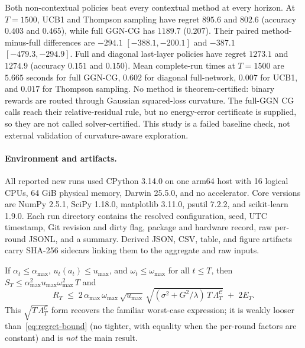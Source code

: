 \documentclass[twoside]{article}
\newcommand{\Calg}{\mathcal{C}}                 %
\newcommand{\Lamalg}{\Lambda^{\Calg}}           %
\begin{document}
\begin{table}[t]
\centering\small

\caption{Covertype evaluation-seed means, shown as cumulative pseudo-regret /
accuracy.  Contextual hyperparameters are selected only on validation seeds;
UCB1 and Thompson sampling are parameter-free.  Per-horizon marginal and paired
95\% Student-$t$ intervals, runtimes, policy types, and certification status are
in \nolinkurl{results/derived/covertype_horizon_results.json}.}
\label{tab:covertype-horizons}
\end{table}

Both non-contextual policies beat every contextual method at every horizon.  At
$T=1500$, UCB1 and Thompson sampling have regret $895.6$ and $802.6$ (accuracy
$0.403$ and $0.465$), while full GGN-CG has $1189.7$ ($0.207$).  Their paired
method-minus-full differences are $-294.1$ $[-388.1,-200.1]$ and
$-387.1$ $[-479.3,-294.9]$.  Full and diagonal last-layer policies have regret
$1273.1$ and $1274.9$ (accuracy $0.151$ and $0.150$).  Mean complete-run times
at $T=1500$ are $5.665$ seconds for full GGN-CG, $0.602$ for diagonal
full-network, $0.007$ for UCB1, and $0.017$ for Thompson sampling.  No method is
theorem-certified: binary rewards are routed through Gaussian squared-loss
curvature.  The full-GGN CG calls reach their relative-residual rule, but no
energy-error certificate is supplied, so they are not called solver-certified.
This study is a failed baseline check, not external validation of
curvature-aware exploration.

\paragraph{Environment and artifacts.}
All reported new runs used CPython 3.14.0 on one arm64 host with 16 logical CPUs,
64 GiB physical memory, Darwin 25.5.0, and no accelerator.  Core versions are NumPy
2.5.1, SciPy 1.18.0, matplotlib 3.11.0, psutil 7.2.2, and scikit-learn 1.9.0.
Each run directory contains the resolved configuration, seed, UTC timestamp, Git
revision and dirty flag, package and hardware record, raw per-round JSONL, and a
summary.  Derived JSON, CSV, table, and figure artifacts carry SHA-256 sidecars
linking them to the aggregate and raw inputs.

\begin{corollary}\label{cor:worstcase}
If $\alpha_t\le\alpha_{\max}$, $u_t(a_t)\le u_{\max}$, and
$\omega_t\le\omega_{\max}$ for all $t\le T$, then
$S_T\le\alpha_{\max}^2 u_{\max}\omega_{\max}^2\,T$
and
\[
  R_T \;\le\; 2\,\alpha_{\max}\,\omega_{\max}\,\sqrt{u_{\max}}\,
  \sqrt{(\sigma^2+G^2/\lambda)\,T\,\Lamalg_T}\;+\;2E_T .
\]
This $\sqrt{T\,\Lamalg_T}$ form recovers the familiar worst-case expression;
it is weakly looser than~\eqref{eq:regret-bound} (no tighter, with equality when
the per-round factors are constant) and is \emph{not} the main result.
\end{corollary}
\end{document}
